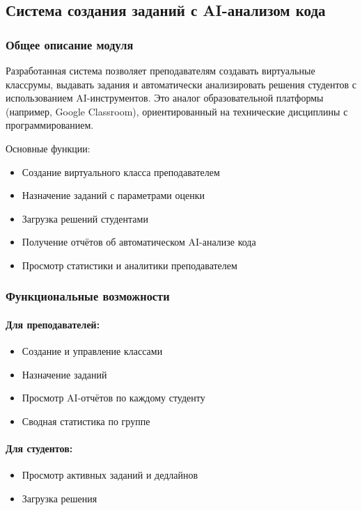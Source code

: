 \subsection{Система создания заданий с AI-анализом кода}

\subsubsection{Общее описание модуля}
Разработанная система позволяет преподавателям создавать виртуальные классрумы, выдавать задания и автоматически анализировать решения студентов с использованием AI-инструментов. Это аналог образовательной платформы (например, Google Classroom), ориентированный на технические дисциплины с программированием.

Основные функции:
\begin{itemize}
    \item Создание виртуального класса преподавателем
    \item Назначение заданий с параметрами оценки
    \item Загрузка решений студентами
    \item Получение отчётов об автоматическом AI-анализе кода
    \item Просмотр статистики и аналитики преподавателем
\end{itemize}

\subsubsection{Функциональные возможности}

\paragraph{Для преподавателей:}
\begin{itemize}
    \item Создание и управление классами
    \item Назначение заданий
    \item Просмотр AI-отчётов по каждому студенту
    \item Сводная статистика по группе
\end{itemize}

\paragraph{Для студентов:}
\begin{itemize}
    \item Просмотр активных заданий и дедлайнов
    \item Загрузка решения
\end{itemize}

